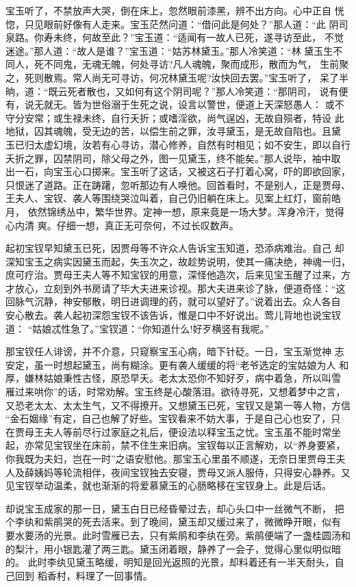 宝玉听了，不禁放声大哭，倒在床上，忽然眼前漆黑，辨不出方向。心中正自
恍惚，只见眼前好像有人走来。宝玉茫然问道：“借问此是何处？”那人道：“此
阴司泉路。你寿未终，何故至此？”宝玉道：“适闻有一故人已死，遂寻访至此，
不觉迷途。”那人道：“故人是谁？”宝玉道：“姑苏林黛玉。”那人冷笑道：“林
黛玉生不同人，死不同鬼，无魂无魄，何处寻访?凡人魂魄，聚而成形，散而为气，
生前聚之，死则散焉。常人尚无可寻访，何况林黛玉呢?汝快回去罢。”宝玉听了，
呆了半晌，道：“既云死者散也，又如何有这个阴司呢？”那人冷笑道：“那阴司，
说有便有，说无就无。皆为世俗溺于生死之说，设言以警世，便道上天深怒愚人：
或不守分安常；或生禄未终，自行夭折；或嗜淫欲，尚气逞凶，无故自殒者，特设
此地狱，囚其魂魄，受无边的苦，以偿生前之罪，汝寻黛玉，是无故自陷也。且黛
玉已归太虚幻境，汝若有心寻访，潜心修养，自然有时相见；如不安生，即以自行
夭折之罪，囚禁阴司，除父母之外，图一见黛玉，终不能矣。”那人说毕，袖中取
出一石，向宝玉心口掷来。宝玉听了这话，又被这石子打着心窝，吓的即欲回家，
只恨迷了道路。正在踌躇，忽听那边有人唤他。回首看时，不是别人，正是贾母、
王夫人、宝钗、袭人等围绕哭泣叫着，自己仍旧躺在床上。见案上红灯，窗前皓月，
依然锦绣丛中，繁华世界。定神一想，原来竟是一场大梦。浑身冷汗，觉得心内清
爽。仔细一想，真正无可奈何，不过长叹数声。

起初宝钗早知黛玉已死，因贾母等不许众人告诉宝玉知道，恐添病难治。自己
却深知宝玉之病实因黛玉而起，失玉次之，故趁势说明，使其一痛决绝，神魂一归，
庶可疗治。贾母王夫人等不知宝钗的用意，深怪他造次，后来见宝玉醒了过来，方
才放心，立刻到外书房请了毕大夫进来诊视。那大夫进来诊了脉，便道奇怪：“这
回脉气沉静，神安郁散，明日进调理的药，就可以望好了。”说着出去。众人各自
安心散去。袭人起初深怨宝钗不该告诉，惟是口中不好说出。莺儿背地也说宝钗道：
“姑娘忒性急了。”宝钗道：“你知道什么!好歹横竖有我呢。”

那宝钗任人诽谤，并不介意，只窥察宝玉心病，暗下针砭。一日，宝玉渐觉神
志安定，虽一时想起黛玉，尚有糊涂。更有袭人缓缓的将“老爷选定的宝姑娘为人
和厚，嫌林姑娘秉性古怪，原恐早夭。老太太恐你不知好歹，病中着急，所以叫雪
雁过来哄你”的话，时常劝解。宝玉终是心酸落泪。欲待寻死，又想着梦中之言，
又恐老太太、太太生气，又不得撩开。又想黛玉已死，宝钗又是第一等人物，方信
“金石姻缘”有定，自己也解了好些。宝钗看来不妨大事，于是自己心也安了，只
在贾母王夫人等前尽行过家庭之礼后，便设法以释宝玉之忧。宝玉虽不能时常坐
起，亦常见宝钗坐在床前，禁不住生来旧病。宝钗每以正言解劝，以“养身要紧，
你我既为夫妇，岂在一时”之语安慰他。那宝玉心里虽不顺遂，无奈日里贾母王夫
人及薛姨妈等轮流相伴，夜间宝钗独去安寝，贾母又派人服侍，只得安心静养。又
见宝钗举动温柔，就也渐渐的将爱慕黛玉的心肠略移在宝钗身上。此是后话。

却说宝玉成家的那一日，黛玉白日已经昏晕过去，却心头口中一丝微气不断，
把个李纨和紫鹃哭的死去活来。到了晚间，黛玉却又缓过来了，微微睁开眼，似有
要水要汤的光景。此时雪雁已去，只有紫鹃和李纨在旁。紫鹃便端了一盏桂圆汤和
的梨汁，用小银匙灌了两三匙。黛玉闭着眼，静养了一会子，觉得心里似明似暗的。
此时李纨见黛玉略缓，明知是回光返照的光景，却料着还有一半天耐头，自己回到
稻香村，料理了一回事情。

